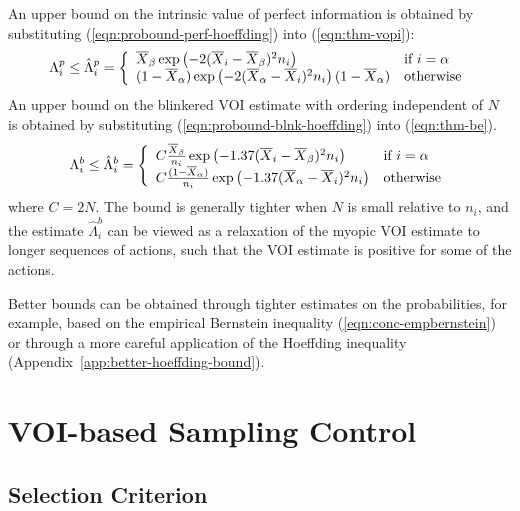 \documentclass{article}
\begin{document}
An upper bound on the intrinsic value of perfect information is obtained by substituting
(\ref{eqn:probound-perf-hoeffding}) into (\ref{eqn:thm-vopi}):
\begin{equation}
  \Lambda_i^p \le \hat\Lambda_i^p=\left\{
  \begin{array}{l l}
    \overline X_\beta\exp\left(- 2(\overline X_i - \overline X_\beta)^2 n_i \right) & \mbox{{\rm if} $i=\alpha$} \\
    (1-\overline  X_\alpha)\exp\left(- 2(\overline X_\alpha - \overline X_i)^2 n_i \right)(1-\overline  X_\alpha)  &  \mbox{\rm otherwise}
  \end{array} \right.
\label{eqn:bound-perf-hoeffding}
\end{equation}
An upper bound on the blinkered VOI estimate with ordering independent of $N$ is obtained
by substituting (\ref{eqn:probound-blnk-hoeffding}) into (\ref{eqn:thm-be}).
\begin{equation}
  \Lambda_i^b \le \hat\Lambda_i^b=\left\{
  \begin{array}{l l}
    C \frac {\overline X_\beta} {n_i}\exp\left(- 1.37(\overline X_i - \overline X_\beta)^2 n_i\right)
      & \mbox{{\rm if} $i=\alpha$} \\
    C \frac {(1-\overline  X_\alpha)} {n_i} \exp\left(- 1.37(\overline X_\alpha - \overline X_i)^2 n_i\right)
      &  \mbox{\rm otherwise}
  \end{array} \right.
\label{eqn:bound-blnk-hoeffding}
\end{equation}
where $C=2N$. The bound is generally tighter when $N$ is small relative to $n_i$,
and the estimate $\hat\Lambda_i^b$ can be viewed as a relaxation of the myopic VOI
estimate to longer sequences of actions, such
that the VOI estimate is positive for some of the actions.

Better bounds can be obtained through tighter estimates on the
probabilities, for example, based on the empirical Bernstein inequality
(\ref{eqn:conc-empbernstein}) or through a more careful application of
the Hoeffding inequality (Appendix~\ref{app:better-hoeffding-bound}).

\section{VOI-based Sampling Control}

\subsection{Selection Criterion}
\end{document}
